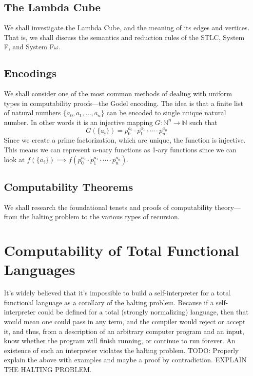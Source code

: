 \documentclass{article}
\begin{document}
\subsection{The Lambda Cube}
We shall investigate the Lambda Cube, and the meaning of its edges and vertices. That is, we shall discuss the semantics and reduction rules of the STLC, System F, and System F$\omega$.

\subsection{Encodings}
We shall consider one of the most common methods of dealing with uniform types in computability proofs—the Godel encoding.
The idea is that a finite list of natural numbers $\{a_0,a_1,\ldots,a_n\}$ can be encoded to single unique natural number. In other words it is an injective mapping $G:\mathbb{N}^n\to \mathbb{N}$ such that
\begin{equation*}
    G(\{a_i\})=p_0^{a_0}\cdot p_1^{a_1}\cdot \cdots \cdot p_n^{a_n}    
\end{equation*}
Since we create a prime factorization, which are unique, the function is injective. This means we can represent $n$-nary functions
as 1-ary functions since we can look at $f(\{a_i\})\implies f(p_0^{a_0}\cdot p_1^{a_1}\cdot \cdots \cdot p_n^{a_n})$.

\subsection{Computability Theorems}
We shall research the foundational tenets and proofs of computability theory—from the halting problem to the various types of recursion.

\section{Computability of Total Functional Languages}

It's widely believed that it's impossible to build a self-interpreter for a total functional language as a corollary of the halting problem. Because if a self-interpreter could be defined for a total (strongly normalizing) language, then that would mean one could pass in any term, and the compiler would reject or accept it, and thus, from a description of an arbitrary computer program and an input, know whether the program will finish running, or continue to run forever. An existence of such an interpreter violates the halting problem.
TODO: Properly explain the above with examples and maybe a proof by contradiction. EXPLAIN THE HALTING PROBLEM.
\end{document}
